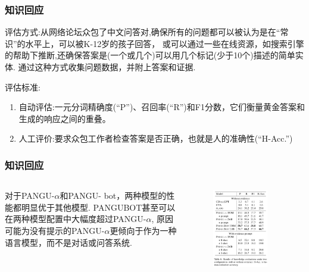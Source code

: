 \documentclass{beamer}
\begin{document}
\begin{frame}
    \frametitle{知识回应}
    评估方式:从网络论坛众包了中文问答对,确保所有的问题都可以被认为是在“常识”的水平上，可以被K-12岁的孩子回答，
    或可以通过一些在线资源，如搜索引擎的帮助下推断,还确保答案是(一个或几个)可以用几个标记(少于10个)描述的简单实体.
    通过这种方式收集问题数据，并附上答案和证据.

    评估标准:
    \begin{enumerate}
        \item 自动评估:一元分词精确度(“P”)、召回率(“R”)和F1分数，它们衡量黄金答案和生成的响应之间的重叠。
        \item 人工评价:要求众包工作者检查答案是否正确，也就是人的准确性(“H-Acc.”)
    \end{enumerate}
\end{frame}

\begin{frame}
    \frametitle{知识回应}
    \begin{columns}
        对于PANGU-$\alpha$和PANGU- bot，两种模型的性能都明显优于其他模型.
        PANGUBOT甚至可以在两种模型配置中大幅度超过PANGU-$\alpha$,
        原因可能为没有提示的PANGU-$\alpha$更倾向于作为一种语言模型，而不是对话或问答系统.

        \begin{figure}
            \centering
            \includegraphics[width=0.8\textwidth]{fig/result3.png}
        \end{figure}
    \end{columns}
\end{frame}
\end{document}
